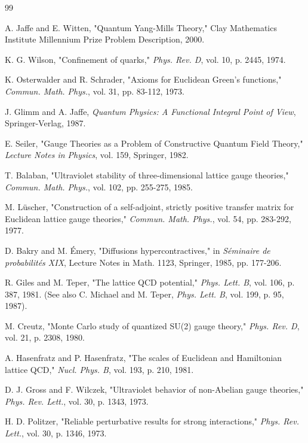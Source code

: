 \begin{thebibliography}{99}

A. Jaffe and E. Witten, "Quantum Yang-Mills Theory," Clay Mathematics Institute Millennium Prize Problem Description, 2000.

K. G. Wilson, "Confinement of quarks," \textit{Phys. Rev. D}, vol. 10, p. 2445, 1974.

K. Osterwalder and R. Schrader, "Axioms for Euclidean Green's functions," \textit{Commun. Math. Phys.}, vol. 31, pp. 83-112, 1973.

J. Glimm and A. Jaffe, \textit{Quantum Physics: A Functional Integral Point of View}, Springer-Verlag, 1987.

E. Seiler, "Gauge Theories as a Problem of Constructive Quantum Field Theory," \textit{Lecture Notes in Physics}, vol. 159, Springer, 1982.

T. Balaban, "Ultraviolet stability of three-dimensional lattice gauge theories," \textit{Commun. Math. Phys.}, vol. 102, pp. 255-275, 1985.

M. Lüscher, "Construction of a self-adjoint, strictly positive transfer matrix for Euclidean lattice gauge theories," \textit{Commun. Math. Phys.}, vol. 54, pp. 283-292, 1977.

D. Bakry and M. Émery, "Diffusions hypercontractives," in \textit{Séminaire de probabilités XIX}, Lecture Notes in Math. 1123, Springer, 1985, pp. 177-206.

R. Giles and M. Teper, "The lattice QCD potential," \textit{Phys. Lett. B}, vol. 106, p. 387, 1981. (See also C. Michael and M. Teper, \textit{Phys. Lett. B}, vol. 199, p. 95, 1987).

M. Creutz, "Monte Carlo study of quantized SU(2) gauge theory," \textit{Phys. Rev. D}, vol. 21, p. 2308, 1980.

A. Hasenfratz and P. Hasenfratz, "The scales of Euclidean and Hamiltonian lattice QCD," \textit{Nucl. Phys. B}, vol. 193, p. 210, 1981.

D. J. Gross and F. Wilczek, "Ultraviolet behavior of non-Abelian gauge theories," \textit{Phys. Rev. Lett.}, vol. 30, p. 1343, 1973.

H. D. Politzer, "Reliable perturbative results for strong interactions," \textit{Phys. Rev. Lett.}, vol. 30, p. 1346, 1973.


\end{thebibliography}
